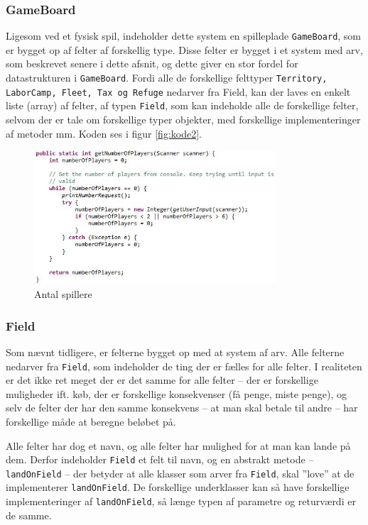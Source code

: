 \subsubsection{GameBoard}
Ligesom ved et fysisk spil, indeholder dette system en spilleplade \texttt{GameBoard}, som er bygget op af felter af forskellig type. Disse felter er bygget i et system med arv, som beskrevet senere i dette afsnit, og dette giver en stor fordel for datastrukturen i \texttt{GameBoard}. Fordi alle de forskellige felttyper \texttt{Territory, LaborCamp, Fleet, Tax og Refuge} nedarver fra Field, kan der laves en enkelt liste (array) af felter, af typen \texttt{Field}, som kan indeholde alle de forskellige felter, selvom der er tale om forskellige typer objekter, med forskellige implementeringer af metoder mm. Koden ses i figur \vref{fig:kode2}.
\begin{figure}[!ht]
\centering
\includegraphics[width=0.8\textwidth]{kode1.jpg}
\caption[<Text for the list of figures>]{Antal spillere}
\label{fig:kode2} 
\end{figure}
\subsubsection{Field} 
Som nævnt tidligere, er felterne bygget op med at system af arv. Alle felterne nedarver fra \texttt{Field}, som indeholder de ting der er fælles for alle felter. I realiteten er det ikke ret meget der er det samme for alle felter – der er forskellige muligheder ift. køb, der er forskellige konsekvenser (få penge, miste penge), og selv de felter der har den samme konsekvens – at man skal betale til andre – har forskellige måde at beregne beløbet på.

Alle felter har dog et navn, og alle felter har mulighed for at man kan lande på dem. Derfor indeholder \texttt{Field} et felt til navn, og en abstrakt metode – \texttt{landOnField} – der betyder at alle klasser som arver fra \texttt{Field}, skal ”love” at de implementerer \texttt{landOnField}. De forskellige underklasser kan så have forskellige implementeringer af \texttt{landOnField}, så længe typen af parametre og returværdi er de samme.


